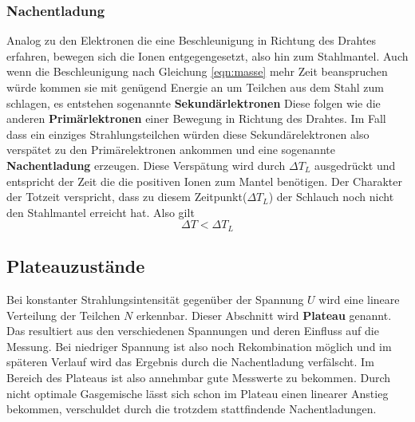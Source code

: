\subsubsection{Nachentladung}
\label{sub:Nachentladung}
Analog zu den Elektronen die eine Beschleunigung in Richtung des Drahtes erfahren, bewegen sich die Ionen entgegengesetzt, also hin zum Stahlmantel.
Auch wenn die Beschleunigung nach Gleichung \eqref{eqn:masse} mehr Zeit beanspruchen würde kommen sie mit genügend Energie an um Teilchen aus dem Stahl zum schlagen, es entstehen sogenannte \textbf{Sekundärlektronen}
Diese folgen wie die anderen \textbf{Primärlektronen} einer Bewegung in Richtung des Drahtes. Im Fall dass ein einziges Strahlungsteilchen würden diese Sekundärelektronen also verspätet zu den Primärelektronen ankommen
und eine sogenannte \textbf{Nachentladung} erzeugen. Diese Verspätung wird durch $\Delta T_L$ ausgedrückt und entspricht der Zeit die die positiven Ionen zum Mantel benötigen.
Der Charakter der Totzeit verspricht, dass zu diesem Zeitpunkt($\Delta T_L$) der Schlauch noch nicht den Stahlmantel erreicht hat. Also gilt
\begin{equation*}
\label{eqn:vergleich}
\Delta T < \Delta T_L
\end{equation*}

\subsection{Plateauzustände}
Bei konstanter Strahlungsintensität gegenüber der Spannung $U$ wird eine lineare Verteilung der Teilchen $N$ erkennbar. Dieser Abschnitt wird 
\textbf{Plateau} genannt. Das resultiert aus den verschiedenen Spannungen und deren Einfluss auf die Messung. Bei niedriger Spannung ist also noch Rekombination möglich und im späteren Verlauf wird das Ergebnis durch die Nachentladung verfälscht. 
Im Bereich des Plateaus ist also annehmbar gute Messwerte zu bekommen. Durch nicht optimale Gasgemische lässt sich schon im Plateau einen linearer Anstieg bekommen,
verschuldet durch die trotzdem stattfindende Nachentladungen.


